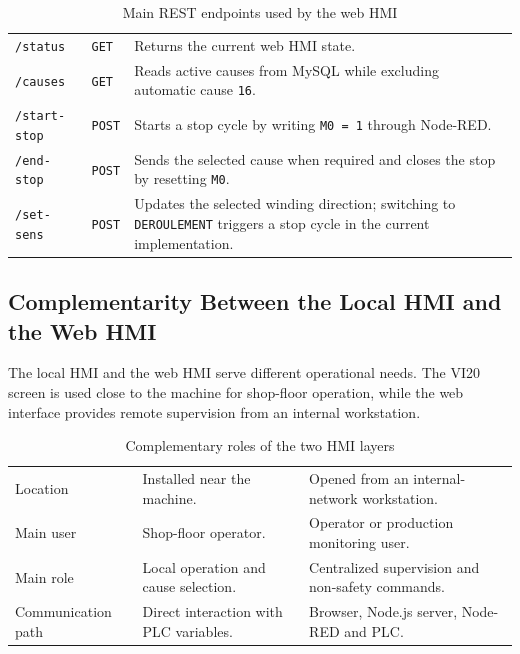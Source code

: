 \begin{table}[H]
\centering
\caption{Main REST endpoints used by the web HMI}
\begin{tabularx}{\textwidth}{|P{0.22\textwidth}|P{0.20\textwidth}|Y|}
\hline
{}
 &  &  \\
\hline
\texttt{/status} & \texttt{GET} & Returns the current web HMI state. \\
\hline
\texttt{/causes} & \texttt{GET} & Reads active causes from MySQL while excluding automatic cause \texttt{16}. \\
\hline
\texttt{/start-stop} & \texttt{POST} & Starts a stop cycle by writing \texttt{M0 = 1} through Node-RED. \\
\hline
\texttt{/end-stop} & \texttt{POST} & Sends the selected cause when required and closes the stop by resetting \texttt{M0}. \\
\hline
\texttt{/set-sens} & \texttt{POST} & Updates the selected winding direction; switching to \texttt{DEROULEMENT} triggers a stop cycle in the current implementation. \\
\hline
\end{tabularx}
\end{table}

\subsection{Complementarity Between the Local HMI and the Web HMI}
The local HMI and the web HMI serve different operational needs. The VI20 screen is used close to the machine for shop-floor operation, while the web interface provides remote supervision from an internal workstation.

\begin{table}[H]
\centering
\caption{Complementary roles of the two HMI layers}
\begin{tabularx}{\textwidth}{|P{0.25\textwidth}|P{0.34\textwidth}|Y|}
\hline
{}
 &  &  \\
\hline
Location & Installed near the machine. & Opened from an internal-network workstation. \\
\hline
Main user & Shop-floor operator. & Operator or production monitoring user. \\
\hline
Main role & Local operation and cause selection. & Centralized supervision and non-safety commands. \\
\hline
Communication path & Direct interaction with PLC variables. & Browser, Node.js server, Node-RED and PLC. \\
\hline
\end{tabularx}
\end{table}

